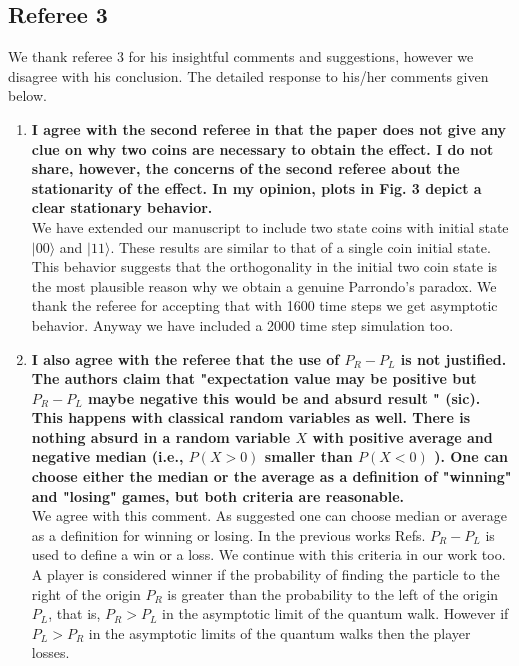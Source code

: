 \documentclass[10pt,a4paper]{article}
\begin{document}
\subsection*{Referee 3}
We thank referee 3 for his insightful comments and suggestions, however we disagree with his conclusion. The detailed response to his/her comments given below.  
\begin{enumerate}
\item \textbf{I agree with the second referee in that the paper does not give any
clue on why two coins are necessary to obtain the effect. I do not
share, however, the concerns of the second referee about the
stationarity of the effect. In my opinion, plots in Fig. 3 depict a
clear stationary behavior.}\\
We have extended our manuscript to include two state coins with initial state $\vert 00\rangle$ and $\vert 11\rangle$. These results are similar to that of a single coin initial state. This behavior suggests that the orthogonality in the initial two coin state is the most plausible reason why we obtain a genuine Parrondo's paradox. We thank the referee for accepting that with 1600 time steps we get asymptotic behavior. Anyway we have included a 2000 time step simulation too.  
\item \textbf{I also agree with the referee that the use of $P_R-P_L$ is not
justified. The authors claim that "expectation value may be positive
but $P_R-P_L$ maybe negative this would be and absurd result " (sic).
This happens with classical random variables as well. There is nothing
absurd in a random variable $X$ with positive average and negative
median (i.e., $P(X>0)$ smaller than $P(X<0)$ ). One can choose either the
median or the average as a definition of "winning" and "losing" games,
but both criteria are reasonable.}\\
We agree with this comment. As suggested one can choose median or average as a definition for winning or losing. In the previous works Refs. \cite{chandru,minli} $P_R-P_L$ is used to define a win or a loss. We continue with this criteria in our work too. A player is considered winner if the probability of finding the particle to the right of the origin $P_R$ is greater than the probability to the left of the origin $P_L$, that is, $P_R > P_L$ in the asymptotic limit of the quantum walk. However if $P_L > P_R$ in the asymptotic limits of the quantum walks then the player losses.


\end{enumerate}
\end{document}
